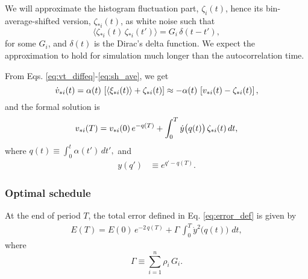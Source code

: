 \documentclass[reprint, superscriptaddress, floatfix]{revtex4-1}
\begin{document}
We will approximate the histogram fluctuation part, $\zeta_i(t)$,
hence its bin-average-shifted version, $\zeta_{*i}(t)$,
as white noise such that
\begin{equation}
  \langle \zeta_{*i}(t) \, \zeta_{*i}(t') \rangle
  = G_i \, \delta(t - t')
  ,
  \label{eq:G_def}
\end{equation}
for some $G_i$,
and $\delta(t)$ is the Dirac's delta function.
%
We expect the approximation to hold for simulation
much longer than the autocorrelation time.
%

From Eqs.
\eqref{eq:vt_diffeq}-\eqref{eq:sh_ave},
we get %
%
\begin{equation}
  \dot v_{*i}(t)
  =
  \alpha(t) \, \left[ \langle \xi_{*i}(t) \rangle + \zeta_{*i}(t) \right]
  \approx
  -\alpha(t) \, \left[ v_{*i}(t) - \zeta_{*i}(t) \right]
  ,
  \notag
\end{equation}
%
and the formal solution is
%
\begin{equation}
  v_{*i}(T)
=
  v_{*i}(0) \, e^{-q(T)}
+
\int_0^T
  \dot y\bigl( q(t) \bigr) \, \zeta_{*i}(t) \, dt,
\notag
\end{equation}
%
where
%
$
q(t) \equiv \int_0^t \alpha(t') \, dt',
$
%
and
%
\begin{align}
y(q')
&\equiv
e^{q' - q(T)}.
\label{eq:y_def}
\end{align}



\subsubsection{Optimal schedule}



At the end of period $T$,
the total error defined in Eq. \eqref{eq:error_def}
is given by
%
\begin{align}
  E(T)
  =
  E(0) \, e^{-2 \, q(T)}
  +
  \Gamma \,
  \int_0^T
    {\dot y}^2\bigl( q(t) \bigr) \,
    \, dt
  ,
  \label{eq:ET_average}
\end{align}
where
\begin{equation}
  \Gamma \equiv \sum_{i=1}^n \rho_i \, G_i.
  \label{eq:Gamma_def}
\end{equation}
\end{document}
